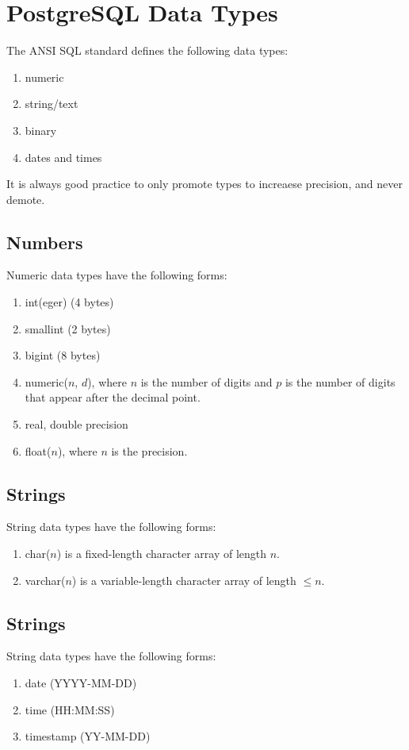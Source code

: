 \documentclass{report}
\newenvironment{aside}[1]{\begin{tcolorbox}[title={Aside: #1},colback=blue!5!white,colframe=black!75!blue]}{\end{tcolorbox}}
\begin{document}
\chapter{PostgreSQL Data Types}
The ANSI SQL standard defines the following data types:
\begin{enumerate}[label=\textit{(\roman*)}]
    \item numeric
    \item string/text
    \item binary
    \item dates and times
\end{enumerate}

\begin{aside}{Promoted}
    It is always good practice to only promote types to increaese precision, and never demote.
\end{aside}


\section{Numbers}
Numeric data types have the following forms:
\begin{enumerate}[label=\textit{(\roman*)}]
    \item int(eger) (4 bytes)
    \item smallint (2 bytes)
    \item bigint (8 bytes)
    \item numeric($n$, $d$), where $n$ is the number of digits and $p$ is the number of digits that
        appear after the decimal point.
    \item real, double precision
    \item float($n$), where $n$ is the precision.
\end{enumerate}


\section{Strings}
String data types have the following forms:
\begin{enumerate}[label=\textit{(\roman*)}]
    \item char($n$) is a fixed-length character array of length $n$.
    \item varchar($n$) is a variable-length character array of length $\leq n$.
\end{enumerate}


\section{Strings}
String data types have the following forms:
\begin{enumerate}[label=\textit{(\roman*)}]
    \item date (YYYY-MM-DD)
    \item time (HH:MM:SS)
    \item timestamp (YY-MM-DD)
\end{enumerate}
\end{document}
